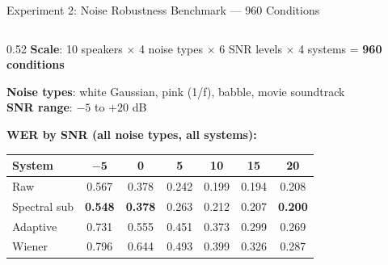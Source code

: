 \documentclass[aspectratio=169]{beamer}
\begin{document}
\begin{frame}{Experiment 2: Noise Robustness Benchmark — 960 Conditions}
  \begin{columns}[T]
    \begin{column}{0.52\textwidth}
      \textbf{Scale}: 10 speakers $\times$ 4 noise types $\times$ 6 SNR levels $\times$ 4 systems = \textbf{960 conditions}

      \vspace{0.2cm}
      \textbf{Noise types}: white Gaussian, pink (1/f), babble, movie soundtrack\\
      \textbf{SNR range}: $-5$ to $+20$ dB

      \vspace{0.2cm}
      \textbf{WER by SNR (all noise types, all systems):}
      \begin{center}
        \scriptsize
        \begin{tabular}{@{}lcccccc@{}}
          \toprule
          \textbf{System} & $\mathbf{-5}$ & \textbf{0} & \textbf{5} & \textbf{10} & \textbf{15} & \textbf{20} \\
          \midrule
          Raw & 0.567 & 0.378 & 0.242 & 0.199 & 0.194 & 0.208 \\
          Spectral sub & \textbf{0.548} & \textbf{0.378} & 0.263 & 0.212 & 0.207 & \textbf{0.200} \\
          Adaptive & 0.731 & 0.555 & 0.451 & 0.373 & 0.299 & 0.269 \\
          Wiener & 0.796 & 0.644 & 0.493 & 0.399 & 0.326 & 0.287 \\
          \bottomrule
        \end{tabular}
      \end{center}


\end{column}
\end{columns}
\end{frame}
\end{document}
